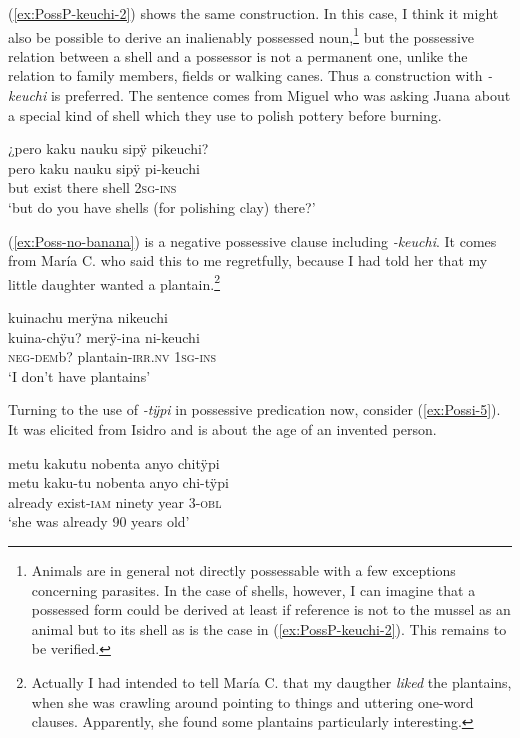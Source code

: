 (\ref{ex:PossP-keuchi-2}) shows the same construction. In this case, I think it might also be possible to derive an inalienably possessed noun,\footnote{Animals are in general not directly possessable with a few exceptions concerning parasites. In the case of shells, however, I can imagine that a possessed form could be derived at least if reference is not to the mussel as an animal but to its shell as is the case in (\ref{ex:PossP-keuchi-2}). This remains to be verified.} but the possessive relation between a shell and a possessor is not a permanent one, unlike the relation to family members, fields or walking canes. Thus a construction with \textit{-keuchi} is preferred. The sentence comes from Miguel who was asking Juana about a special kind of shell which they use to polish pottery before burning.

\ea\label{ex:PossP-keuchi-2}
\begingl 
\glpreamble ¿pero kaku nauku sipÿ pikeuchi?\\
\gla pero kaku nauku sipÿ pi-keuchi\\ 
\glb but exist there shell 2\textsc{sg}-\textsc{ins}\\ 
\glft ‘but do you have shells (for polishing clay) there?’
\trailingcitation{[jmx-d110918ls-1.098]}
\xe

(\ref{ex:Poss-no-banana}) is a negative possessive clause including \textit{-keuchi}. It comes from María C. who said this to me regretfully, because I had told her that my little daughter wanted a plantain.\footnote{Actually I had intended to tell María C. that my daugther \textit{liked} the plantains, when she was crawling around pointing to things and uttering one-word clauses. Apparently, she found some plantains particularly interesting.}

\ea\label{ex:Poss-no-banana}
\begingl 
\glpreamble kuinachu merÿna nikeuchi\\
\gla kuina-chÿu? merÿ-ina ni-keuchi\\ 
\glb \textsc{neg}-\textsc{dem}b? plantain-\textsc{irr.nv} 1\textsc{sg}-\textsc{ins}\\ 
\glft ‘I don’t have plantains’
\trailingcitation{[uxx-p110825l.173]}
\xe

Turning to the use of \textit{-tÿpi} in possessive predication now, consider (\ref{ex:Possi-5}). It was elicited from Isidro and is about the age of an invented person.

\ea\label{ex:Possi-5}
\begingl 
\glpreamble metu kakutu nobenta anyo chitÿpi\\
\gla metu kaku-tu nobenta anyo chi-tÿpi\\ 
\glb already exist-\textsc{iam} ninety year 3-\textsc{obl}\\ 
\glft ‘she was already 90 years old’
\trailingcitation{[dxx-d120416s.203]}
\xe

